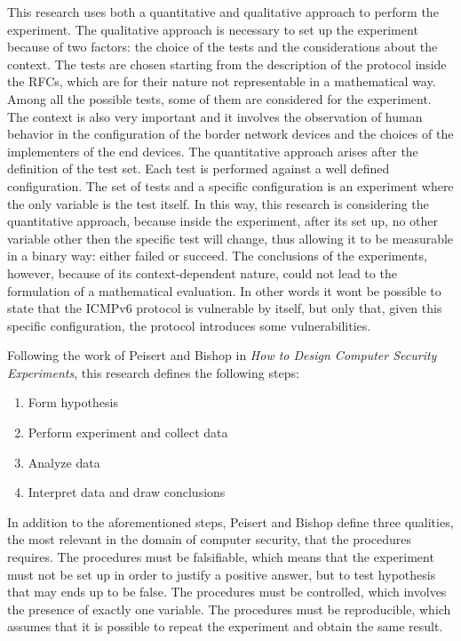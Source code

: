 \documentclass[12pt]{article}
\begin{document}
This research uses both a quantitative and qualitative approach to perform the experiment. The qualitative approach is necessary to set up the experiment because of two factors: the choice of the tests and the considerations about the context. The tests are chosen starting from the description of the protocol inside the RFCs, which are for their nature not representable in a mathematical way. Among all the possible tests, some of them are considered for the experiment. The context is also very important and it involves the observation of human behavior in the configuration of the border network devices and the choices of the implementers of the end devices. The quantitative approach arises after the definition of the test set. Each test is performed against a well defined configuration. The set of tests and a specific configuration is an experiment where the only variable is the test itself. In this way, this research is considering the quantitative approach, because inside the experiment, after its set up, no other variable other then the specific test will change, thus allowing it to be measurable in a binary way: either failed or succeed. The conclusions of the experiments, however, because of its context-dependent nature, could not lead to the formulation of a mathematical evaluation. In other words it wont be possible to state that the ICMPv6 protocol is vulnerable by itself, but only that, given this specific configuration, the protocol introduces some vulnerabilities.

Following the work of Peisert and Bishop in \textit{How to Design Computer Security Experiments}, this research defines the following steps:
\vspace{-10pt}
\begin{enumerate}[noitemsep,topsep=0pt,partopsep=0pt]
 \item Form hypothesis
 \item Perform experiment and collect data
 \item Analyze data
 \item Interpret data and draw conclusions
\end{enumerate}

In addition to the aforementioned steps, Peisert and Bishop define three qualities, the most relevant in the domain of computer security, that the procedures requires. The procedures must be falsifiable, which means that the experiment must not be set up in order to justify a positive answer, but to test hypothesis that may ends up to be false. The procedures must be controlled, which involves the presence of exactly one variable. The procedures must be reproducible, which assumes that it is possible to repeat the experiment and obtain the same result.\cite{secExperiments}
\end{document}
